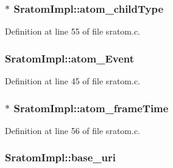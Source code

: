 \subsubsection[{\texorpdfstring{atom\+\_\+child\+Type}{atom_childType}}]{$\ast$ Sratom\+Impl\+::atom\+\_\+child\+Type}\hypertarget{struct_sratom_impl_afda1cc8e25dbe39537a8ea14ce6a13f6}{}\label{struct_sratom_impl_afda1cc8e25dbe39537a8ea14ce6a13f6}


Definition at line 55 of file sratom.\+c.

\subsubsection[{\texorpdfstring{atom\+\_\+\+Event}{atom_Event}}]{ Sratom\+Impl\+::atom\+\_\+\+Event}\hypertarget{struct_sratom_impl_a9ac8ae1906354506e3b796e03487d323}{}\label{struct_sratom_impl_a9ac8ae1906354506e3b796e03487d323}


Definition at line 45 of file sratom.\+c.

\subsubsection[{\texorpdfstring{atom\+\_\+frame\+Time}{atom_frameTime}}]{$\ast$ Sratom\+Impl\+::atom\+\_\+frame\+Time}\hypertarget{struct_sratom_impl_a789b9f772ea20294e88cf57259662fcb}{}\label{struct_sratom_impl_a789b9f772ea20294e88cf57259662fcb}


Definition at line 56 of file sratom.\+c.

\subsubsection[{\texorpdfstring{base\+\_\+uri}{base_uri}}]{ Sratom\+Impl\+::base\+\_\+uri}\hypertarget{struct_sratom_impl_a559728865a5c92b3ce3cf1c1139ab2f6}{}\label{struct_sratom_impl_a559728865a5c92b3ce3cf1c1139ab2f6}



